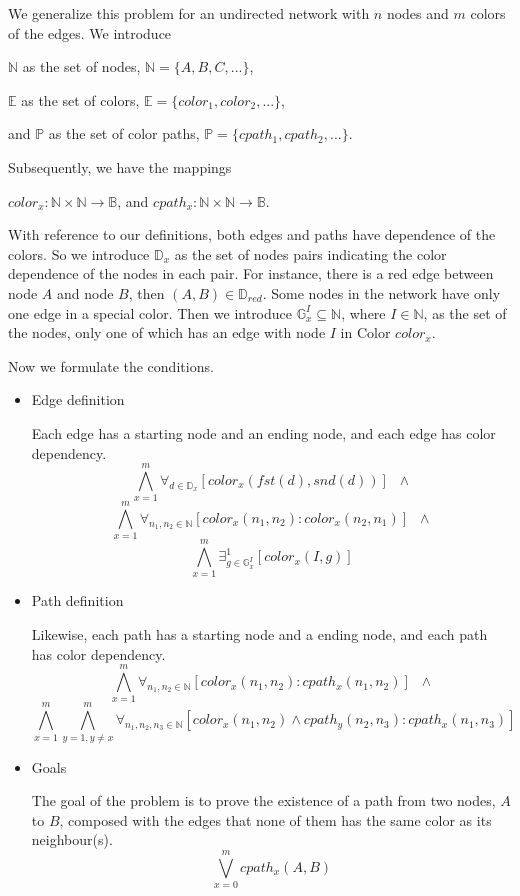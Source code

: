 We generalize this problem for an undirected network with $n$ nodes and $m$ colors of the edges. We introduce
\begin{center}
$\mathbb{N}$ as the set of nodes, $\mathbb{N} = \{A, B, C, ... \}$,

$\mathbb{E}$ as the set of colors, $\mathbb{E} = \{color_1, color_2, ...\}$,

and $\mathbb{P}$ as the set of color paths, $\mathbb{P} = \{cpath_1, cpath_2, ...\}$.
\end{center}
Subsequently, we have the mappings
\begin{center}
$color_x : \mathbb{N}\times \mathbb{N} \rightarrow \mathbb{B}$, and $cpath_x : \mathbb{N}\times \mathbb{N} \rightarrow \mathbb{B}$.
\end{center}

With reference to our definitions, both edges and paths have dependence of the colors. So we introduce $\mathbb{D}_x$ as the set of nodes pairs indicating the color dependence of the nodes in each pair. For instance, there is a red edge between node $A$ and node $B$, then $(A, B) \in \mathbb{D}_{red} $. Some nodes in the network have only one edge in a special color. Then we introduce $\mathbb{G}_x^I \subseteq \mathbb{N}$, where $I \in \mathbb{N}$, as the set of the nodes, only one of which has an edge with node $I$ in Color $color_x$.

\noindent Now we formulate the conditions.

\begin{itemize}
  \item Edge definition

  Each edge has a starting node and an ending node, and each edge has color dependency.
  \[ \bigwedge_{x=1}^m \forall_{d \in \mathbb{D}_x} [color_x(fst(d), snd(d))] \;\; \wedge \]
  \[ \bigwedge_{x=1}^m \forall_{n_1, n_2 \in \mathbb{N}} [color_x(n_1, n_2) : color_x(n_2, n_1)] \;\; \wedge \]
  \[ \bigwedge_{x=1}^m \exists_{g \in \mathbb{G}_x^I}^1 [color_x(I, g)] \]


  \item Path definition

  Likewise, each path has a starting node and a ending node, and each path has color dependency.
  \[ \bigwedge_{x=1}^m \forall_{n_1, n_2 \in \mathbb{N}} [color_x(n_1, n_2) : cpath_x(n_1, n_2)] \;\; \wedge \]
  \[ \bigwedge_{x=1}^m \bigwedge_{y=1,y\neq x}^m \forall_{n_1, n_2, n_3 \in \mathbb{N}} [color_x(n_1, n_2) \wedge cpath_y(n_2, n_3) : cpath_x(n_1, n_3)] \]

  \item Goals

  The goal of the problem is to prove the existence of a path from two nodes, $A$ to $B$, composed with the edges that none of them has the same color as its neighbour(s).
  \[ \bigvee_{x=0}^m cpath_x(A, B) \]

\end{itemize}

